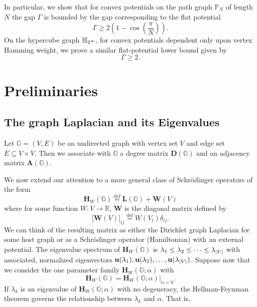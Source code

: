   In particular, we show that for convex potentials on the path graph $\mathbb{P}_N$ of length $N$ the gap $\Gamma$ is bounded by the gap corresponding to the flat potential
  \begin{equation}
    \Gamma \geq 2\left(1-\cos\left(\frac{\pi}{N}\right)\right).
  \end{equation}
  On the hypercube graph $\mathbb{H}_{2^N}$, for convex potentials dependent only upon vertex Hamming weight, we prove a similar flat-potential lower bound given by
    \begin{equation}
    \Gamma \geq 2.
  \end{equation}

\section{Preliminaries}\label{sec:prelim}
  \subsection{The graph Laplacian and its Eigenvalues}\label{sec:prelim_eigenvalues}
    Let $\mathbb{G}=(V,E)$ be an undirected graph with vertex set $V$ and edge set $E\subseteq V \times V$. Then we associate with $\mathbb{G}$ a degree matrix $\mathbf{D}(\mathbb{G})$ and an adjacency matrix $\mathbf{A}(\mathbb{G})$.

    We now extend our attention to a more general class of Schr\"{o}dinger operators of the form
    \begin{equation}
      \mathbf{H}_W(\mathbb{G}) \stackrel{\text{def}}{=} \mathbf{L}(\mathbb{G}) + \mathbf{W}(V) \label{eqn:hw}
    \end{equation}
    where for some function $W:V\rightarrow\mathbb{R}$, $\mathbf{W}$ is the diagonal matrix defined by
    \begin{equation}
      \big[\mathbf{W}(V)\big]_{ij} \stackrel{\text{def}}{=} W(V_i) \delta_{ij}.
    \end{equation}
    We can think of the resulting matrix as either the Dirichlet graph Laplacian for some host graph or as a Schr\"{o}dinger operator (Hamiltonian) with an external potential. The eigenvalue spectrum of $\mathbf{H}_W(\mathbb{G})$ is $\lambda_1 \leq \lambda_2 \leq \dots \leq \lambda_{\lvert V\rvert}$ with associated, normalized eigenvectors $\mathbf{u}(\lambda_1),\mathbf{u}(\lambda_2),\dots,\mathbf{u}(\lambda_{\lvert V\rvert})$. Suppose now that we consider the one parameter family $\mathbf{H}_W(\mathbb{G};\alpha)$ with
    \begin{equation}
      \mathbf{H}_W(\mathbb{G}) = \mathbf{H}_W(\mathbb{G};\alpha) \Big\rvert_{\alpha=0}.
    \end{equation}
    If $\lambda_k$ is an eigenvalue of $\mathbf{H}_W(\mathbb{G};\alpha)$ with no degeneracy, the Hellman-Feynman theorem governs the relationship between $\lambda_k$ and $\alpha$. That is,
    \HellmanFeynman*

